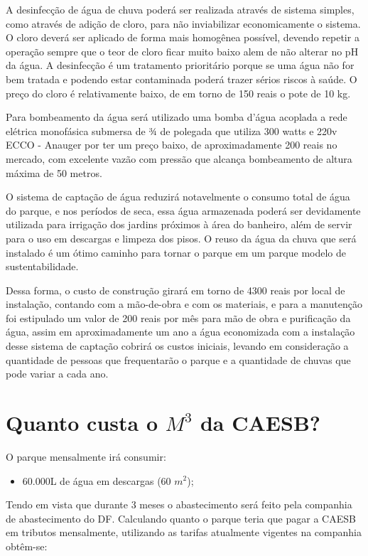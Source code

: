 A desinfecção de água de chuva poderá ser realizada através de sistema simples, como através de adição de cloro, para não inviabilizar economicamente o sistema. O cloro deverá ser aplicado de forma mais homogênea possível, devendo repetir a operação sempre que o teor de cloro ficar muito baixo alem de não alterar no pH da água. A desinfecção é um tratamento prioritário porque se uma água não for bem tratada e podendo estar contaminada poderá trazer sérios riscos à saúde. O preço do cloro é relativamente baixo, de em torno de 150 reais o pote de 10 kg.

Para bombeamento da água será utilizado uma bomba d’água acoplada a rede elétrica monofásica submersa de ¾ de polegada que utiliza 300 watts e 220v ECCO - Anauger por ter um preço baixo, de aproximadamente 200 reais no mercado, com excelente vazão com pressão que alcança bombeamento de altura máxima de 50 metros.

O sistema de captação de água reduzirá notavelmente o consumo total de água do parque, e nos períodos de seca, essa água armazenada poderá ser devidamente utilizada para irrigação dos jardins próximos à área do banheiro, além de servir para o uso em descargas e limpeza dos pisos. O reuso da água da chuva que será instalado é um ótimo caminho para tornar o parque em um parque modelo de sustentabilidade.

Dessa forma, o custo de construção girará em torno de 4300 reais por local de instalação, contando com a mão-de-obra e com os materiais, e para a manutenção foi estipulado um valor de 200 reais por mês para mão de obra e purificação da água, assim em aproximadamente um ano a água economizada com a instalação desse sistema de captação cobrirá os custos iniciais, levando em consideração a quantidade de pessoas que frequentarão o parque e a quantidade de chuvas que pode variar a cada ano.

\section{Quanto custa o $M^{3}$ da CAESB?}

O parque mensalmente irá consumir:
\begin{itemize}
	\item 60.000L de água em descargas (60 $m^{2}$);
\end{itemize}

	
	Tendo em vista que durante 3 meses o abastecimento será feito pela companhia de abastecimento do DF. Calculando quanto o parque teria que pagar a CAESB em tributos mensalmente, utilizando as tarifas atualmente vigentes na companhia obtêm-se: 
	
